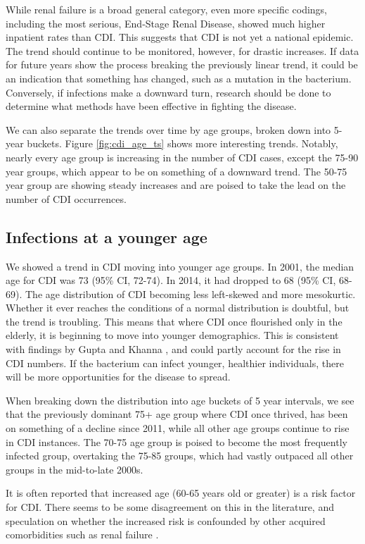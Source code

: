 \documentclass[12pt]{ociamthesis}\usepackage[]{graphicx}\usepackage[]{color}
\newcommand{\ci}[3]{#1 (95\% CI, #2-#3)}
\begin{document}
While renal failure is a broad general category, even more specific codings, including the most serious, 
End-Stage Renal Disease, showed much higher inpatient rates than CDI. 
This suggests that CDI is not yet a national epidemic. The trend should continue to be
monitored, however, for drastic increases. If data for future years show the process breaking the previously linear trend, it could be an indication
that something has changed, such as a mutation in the bacterium. Conversely, if infections make a downward turn, research should be done
to determine what methods have been effective in fighting the disease.


We can also separate the trends over time by age groups, broken down into 5-year buckets. Figure \ref{fig:cdi_age_ts} shows more interesting trends.
Notably, nearly every age group is increasing in the number of CDI cases, except the 75-90 year groups, which appear to be on something of a downward trend.
The 50-75 year group are showing steady increases and are poised to take the lead on the number of CDI occurrences. 


\subsection{Infections at a younger age}
We showed a trend in CDI moving into younger age groups. 
In 2001, the median age for CDI was \ci{73}{72}{74}. In 2014, it had dropped to \ci{68}{68}{69}.
The age distribution of CDI becoming less left-skewed and more mesokurtic.
Whether it ever reaches the conditions of a normal distribution is doubtful, 
but the trend is troubling. This means that where CDI once flourished only in the elderly, it is beginning to move into younger demographics. 
This is consistent with findings by Gupta and Khanna \cite{Gupta2014}, and could partly account for the rise in CDI numbers. 
If the bacterium can infect younger, healthier individuals, there will be more opportunities for the disease to spread.

When breaking down the distribution into age buckets of 5 year intervals, we see that the previously dominant 75+ age group where
CDI once thrived, has been on something of a decline since 2011, while all other age groups continue to rise in CDI instances.
The 70-75 age group is poised to become the most frequently infected group, overtaking the 75-85 groups, which had vastly
outpaced all other groups in the mid-to-late 2000s.

It is often reported that increased age (60-65 years old or greater) is a risk factor for CDI.
There seems to be some disagreement on this in the literature, and speculation on whether the increased risk is confounded by other
acquired comorbidities such as renal failure \cite{Krapohl2013, Masgala2014}.
\end{document}
